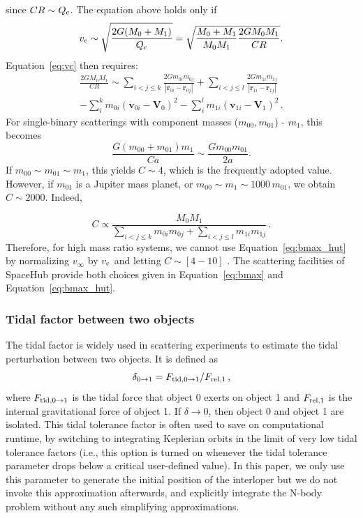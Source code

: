 \documentclass[twocolumn]{aastex63}
\newcommand*\eqn[1]{Equation~\ref{#1}}
\begin{document}
since $CR\sim Q_{\rm c}$.  The equation above holds only if 
\begin{equation}
v_{\rm c} \sim \sqrt{\frac{2G(M_0+M_1)}{Q_{\rm c}}}=\sqrt{\frac{M_0+M_1}{M_0M_1}\frac{2GM_0M_1}{CR}}.
\end{equation}
\eqn{eq:vc} then requires:
\begin{eqnarray}
\frac{2GM_0M_1}{CR} \sim \sum_{i<j\le k}\frac{2Gm_{0i}m_{0j}}{|\mathbf{r}_{0i} - \mathbf{r}_{0j}|} +  \sum_{i<j\le l}\frac{2Gm_{1i}m_{1j}}{|\mathbf{r}_{1i} - \mathbf{r}_{1j}|} \nonumber\\
- \sum_i^k {m_{0i}(\mathbf{v}_{0i}-\mathbf{V}_0)^2}
  - \sum_i^l {m_{1i}(\mathbf{v}_{1i}-\mathbf{V}_1)^2}\,.
\end{eqnarray}
For single-binary scatterings with component masses ($m_{00},m_{01}$) - $m_1$, this becomes
\begin{equation}
\frac{G(m_{00}+m_{01})m_1}{Ca} \sim  \frac{Gm_{00}m_{01}}{2a}.
\end{equation}
If $m_{00} \sim m_{01} \sim m_1$, this yields $C\sim 4$, which is the frequently adopted value. However, if $m_{01}$ is a Jupiter mass planet, or $m_{00} \sim m_1 \sim 1000\,m_{01}$, we obtain $C \sim 2000$. Indeed,

\begin{equation}
C \propto \frac{M_0M_1}{\sum_{i<j\le k}m_{0i}m_{0j} + \sum_{i<j\le l}m_{1i}m_{1j}}\,.
\end{equation}
Therefore, for high mass ratio systems, we cannot use \eqn{eq:bmax_hut} by normalizing $v_\infty$ by $v_{\rm c}$ and letting $C \sim [4-10]$\citep{hut83,fregeau04} . The scattering facilities of SpaceHub provide both choices given in \eqn{eq:bmax} and \eqn{eq:bmax_hut}.

\subsubsection{Tidal factor between two objects}\label{sec:tidal}
The tidal factor is widely used in scattering experiments to estimate the tidal perturbation between two objects. It is  defined as
\begin{equation}
\delta_{0\rightarrow 1} =  F_{\rm tid,0\rightarrow 1}/F_{\rm rel,1}\,,
\end{equation}
where $F_{\rm tid,0\rightarrow 1}$ is the tidal force that object 0 exerts on object 1 and $F_{\rm rel,1}$ is the internal gravitational force of object 1. If $\delta \rightarrow 0$, then object 0 and object 1 are isolated.  This tidal tolerance factor is often used to save on computational runtime, by switching to integrating Keplerian orbits in the limit of very low tidal tolerance factors (i.e., this option is turned on whenever the tidal tolerance parameter drops below a critical user-defined value).  In this paper, we only use this parameter to generate the initial position of the interloper but we do not invoke this approximation afterwards, and explicitly integrate the N-body problem without any such simplifying approximations.
\end{document}
